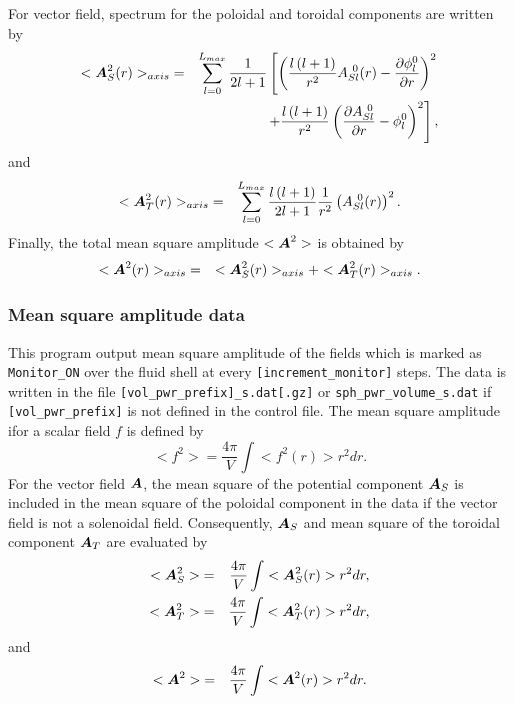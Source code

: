 \begin{description}
%
For vector field, spectrum for the poloidal and toroidal components are written by 
%
\begin{eqnarray}
<\mbox{\boldmath$A$}_{S}^{2}(r)>_{axis} &=&   \sum_{l=0}^{L_{max}} \frac{1}{2l + 1}
\left[  \left(\frac{l\left(l+1 \right) }{r^{2}} A_{Sl}^{\ 0}(r) - \frac{\partial \phi_{l}^{0}}{\partial r} \right)^{2} 
\right. \nonumber \\
& & \left. +  \frac{l \left( l+1 \right)}{r^{2}} \left( \frac{\partial A_{Sl}^{\ 0}}{\partial r} - \phi_{l}^{0} \right)^{2} \right],
\end{eqnarray}
%
and
\begin{eqnarray}
<\mbox{\boldmath$A$}_{T}^{2}(r)>_{axis} &=&  \sum_{l=0}^{L_{max}} \frac{l \left( l+1 \right)}{2l + 1} \frac{1}{r^{2}} 
\left( A_{Sl}^{\ 0}(r) \right)^{2}.
\end{eqnarray}
Finally, the total mean square amplitude $<\mbox{\boldmath$A$}^{2}> $ is obtained by
\begin{eqnarray}
<\mbox{\boldmath$A$}^{2}(r)>_{axis} &=& <\mbox{\boldmath$A$}_{S}^{2}(r)>_{axis}  + <\mbox{\boldmath$A$}_{T}^{2}(r)>_{axis} .
\end{eqnarray}

\end{description}


\subsubsection{Mean square amplitude data}
\label{sec:mean_square}
This program output mean square amplitude of the fields which is marked as \verb|Monitor_ON| over the fluid shell at every \verb|[increment_monitor]| steps. The data is written in the file \verb|[vol_pwr_prefix]_s.dat[.gz]| or  \verb|sph_pwr_volume_s.dat| if \\
{\tt [vol\_pwr\_prefix]} is not defined in the control file. The mean square amplitude ifor a scalar field $f$ is defined by
%
\begin{equation}
<f^{2}> =   \frac{4\pi}{V} \int <f^{2}(r)> r^{2} dr.
\end{equation}
%
For the vector field $\mbox{\boldmath$A$}$, the mean square of the potential component $\mbox{\boldmath$A$}_{S}$ is included in the mean square of the poloidal component in the data if the vector field is not a solenoidal field. Consequently, $\mbox{\boldmath$A$}_{S}$ and mean square of the toroidal component $\mbox{\boldmath$A$}_{T}$ are evaluated by 
%
\begin{eqnarray}
<\mbox{\boldmath$A$}_{S}^{2}> &=& \frac{4\pi}{V} \int <\mbox{\boldmath$A$}_{S}^{2}(r)> r^{2} dr,
\nonumber \\
<\mbox{\boldmath$A$}_{T}^{2}>  &=& \frac{4\pi}{V} \int <\mbox{\boldmath$A$}_{T}^{2}(r)>  r^{2} dr,
\end{eqnarray}
% 
and
%
\begin{eqnarray}
<\mbox{\boldmath$A$}^{2}> &=& \frac{4\pi}{V} \int <\mbox{\boldmath$A$}^{2}(r)>  r^{2} dr.
\label{eq:vol_vec_msq}
\end{eqnarray}

